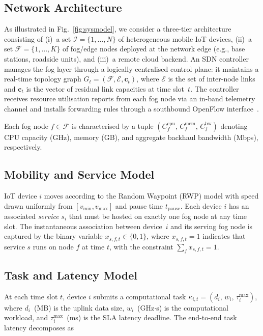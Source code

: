 \documentclass[conference]{IEEEtran}
\newcommand{\F}{\mathcal{F}}
\newcommand{\I}{\mathcal{I}}
\newcommand{\Set}[1]{\mathcal{#1}}
\begin{document}
\subsection{Network Architecture}

As illustrated in Fig.~\ref{fig:sysmodel}, we consider a three-tier
architecture consisting of (i)~a set $\I = \{1,\ldots,N\}$ of
heterogeneous mobile IoT devices,
(ii)~a set $\F = \{1,\ldots,K\}$ of fog/edge nodes deployed at the
network edge (e.g., base stations, roadside units), and (iii)~a
remote cloud backend. An SDN controller manages the fog layer through
a logically centralised control plane: it maintains a real-time
topology graph $G_t = (\F, \Set{E}, \mathbf{c}_t)$, where $\Set{E}$
is the set of inter-node links and $\mathbf{c}_t$ is the vector of
residual link capacities at time slot~$t$. The controller receives
resource utilisation reports from each fog node via an in-band
telemetry channel and installs forwarding rules through a southbound
OpenFlow interface~\cite{misra2019detour,bera2016mobility}.

Each fog node $f \in \F$ is characterised by a tuple
$(C_f^{\mathrm{cpu}},\, C_f^{\mathrm{mem}},\, C_f^{\mathrm{bw}})$
denoting CPU capacity (GHz), memory (GB), and aggregate backhaul
bandwidth (Mbps), respectively.

\subsection{Mobility and Service Model}

IoT device $i$ moves according to the Random Waypoint (RWP) model with
speed drawn uniformly from $[v_{\min}, v_{\max}]$ and pause time
$t_{\mathrm{pause}}$. Each device $i$ has an associated \emph{service}
$s_i$ that must be hosted on exactly one fog node at any time slot.
The instantaneous association between device~$i$ and its serving fog
node is captured by the binary variable
$x_{s,f,t} \in \{0,1\}$, where $x_{s,f,t}=1$ indicates that service
$s$ runs on node $f$ at time $t$, with the constraint
$\sum_{f} x_{s,f,t} = 1$.

\subsection{Task and Latency Model}

At each time slot $t$, device $i$ submits a computational task
$\kappa_{i,t} = (d_i,\, w_i,\, \tau_i^{\max})$, where $d_i$~(MB) is
the uplink data size, $w_i$~(GHz$\cdot$s) is the computational workload,
and $\tau_i^{\max}$~(ms) is the SLA latency deadline.
The end-to-end task latency decomposes as
\end{document}
